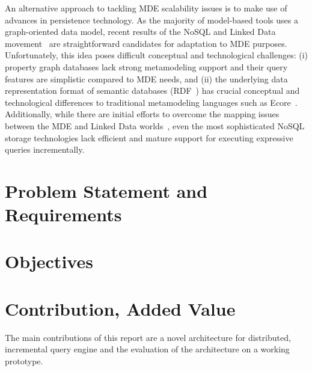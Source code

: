 An alternative approach to tackling MDE scalability issues is to make use of advances in persistence technology. As the majority of model-based tools uses a graph-oriented data model, recent results of the NoSQL and Linked Data movement~\cite{neo4j,openvirtuoso,sesame} are straightforward candidates for adaptation to MDE purposes. Unfortunately, this idea poses difficult conceptual and technological challenges: (i) property graph databases lack strong metamodeling support and their query features are simplistic compared to MDE needs, and (ii) the underlying data representation format of semantic databases (RDF~\cite{website:rdf_standard}) has crucial conceptual and technological differences to traditional metamodeling languages such as Ecore~\cite{EMF}. Additionally, while there are initial efforts to overcome the mapping issues between the MDE and Linked Data worlds~\cite{hillairet2008bridging}, even the most sophisticated NoSQL storage technologies lack efficient and mature support for executing expressive queries incrementally.

\section{Problem Statement and Requirements}

\cite{Scheidgen12}


\section{Objectives}



\section{Contribution, Added Value}

The main contributions of this report are a novel architecture for distributed, incremental query engine and the evaluation of the architecture on a working prototype. 

